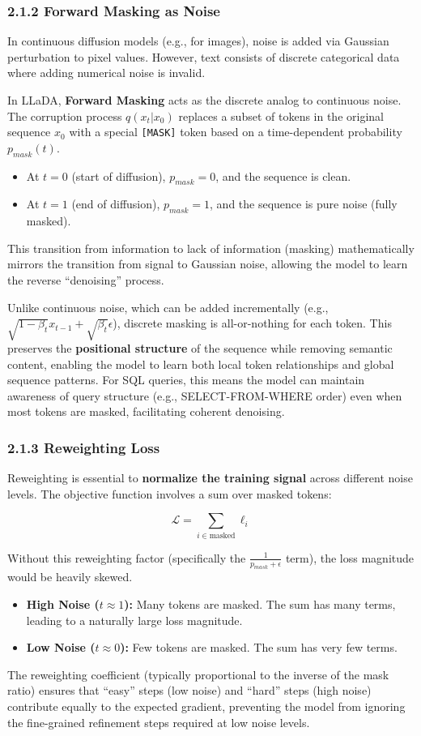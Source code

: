 \documentclass[a4paper,12pt]{article}
\begin{document}
\subsubsection*{2.1.2 Forward Masking as Noise}
In continuous diffusion models (e.g., for images), noise is added via Gaussian perturbation to pixel values. However, text consists of discrete categorical data where adding numerical noise is invalid.

In LLaDA, \textbf{Forward Masking} acts as the discrete analog to continuous noise. The corruption process $q(x_t | x_0)$ replaces a subset of tokens in the original sequence $x_0$ with a special \texttt{[MASK]} token based on a time-dependent probability $p_{mask}(t)$.
\begin{itemize}
\item At $t = 0$ (start of diffusion), $p_{mask} = 0$, and the sequence is clean.
\item At $t = 1$ (end of diffusion), $p_{mask} = 1$, and the sequence is pure noise (fully masked).
\end{itemize}
This transition from information to lack of information (masking) mathematically mirrors the transition from signal to Gaussian noise, allowing the model to learn the reverse ``denoising'' process.

Unlike continuous noise, which can be added incrementally (e.g., $\sqrt{1-\beta_t} x_{t-1} + \sqrt{\beta_t} \epsilon$), discrete masking is all-or-nothing for each token. This preserves the \textbf{positional structure} of the sequence while removing semantic content, enabling the model to learn both local token relationships and global sequence patterns. For SQL queries, this means the model can maintain awareness of query structure (e.g., SELECT-FROM-WHERE order) even when most tokens are masked, facilitating coherent denoising.

\subsubsection*{2.1.3 Reweighting Loss}
Reweighting is essential to \textbf{normalize the training signal} across different noise levels. The objective function involves a sum over masked tokens:

\[
\mathcal{L} = \sum_{i \in \text{masked}} \ell_i
\]

Without this reweighting factor (specifically the $\frac{1}{p_{mask} + \epsilon}$ term), the loss magnitude would be heavily skewed.
\begin{itemize}
\item \textbf{High Noise ($t \approx 1$):} Many tokens are masked. The sum has many terms, leading to a naturally large loss magnitude.
\item \textbf{Low Noise ($t \approx 0$):} Few tokens are masked. The sum has very few terms.
\end{itemize}
The reweighting coefficient (typically proportional to the inverse of the mask ratio) ensures that ``easy'' steps (low noise) and ``hard'' steps (high noise) contribute equally to the expected gradient, preventing the model from ignoring the fine-grained refinement steps required at low noise levels.
\end{document}
